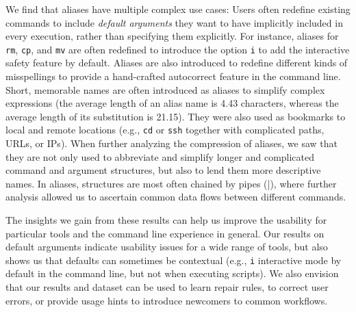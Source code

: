 We find that aliases have multiple complex use cases:
Users often redefine existing commands to include \emph{default arguments} they want to have implicitly included in every execution, rather than specifying them explicitly.
For instance, aliases for \verb|rm|, \verb|cp|, and \verb|mv| are often redefined to introduce the option \verb|i| to add the interactive safety feature by default.
Aliases are also introduced to redefine different kinds of misspellings to provide a hand-crafted autocorrect feature in the command line. 
Short, memorable names are often introduced as aliases to simplify complex expressions (the average length of an alias name is 4.43 characters, whereas the average length of its substitution is 21.15).
They were also used as bookmarks to local and remote locations (e.g., \verb|cd| or \verb|ssh| together with complicated paths, URLs, or IPs).
When further analyzing the compression of aliases, we saw that they are not only used to abbreviate and simplify longer and complicated command and argument structures, but also to lend them more descriptive names.
In aliases, structures are most often chained by pipes (\verb|||), where further analysis allowed us to ascertain common data flows between different commands.

The insights we gain from these results can help us improve the usability for particular tools and the command line experience in general.
Our results on default arguments indicate usability issues for a wide range of tools, but also shows us that defaults can sometimes be contextual (e.g., \verb|i| interactive mode by default in the command line, but not when executing scripts).
We also envision that our results and dataset can be used to learn repair rules, to correct user errors, or provide usage hints to introduce newcomers to common workflows.